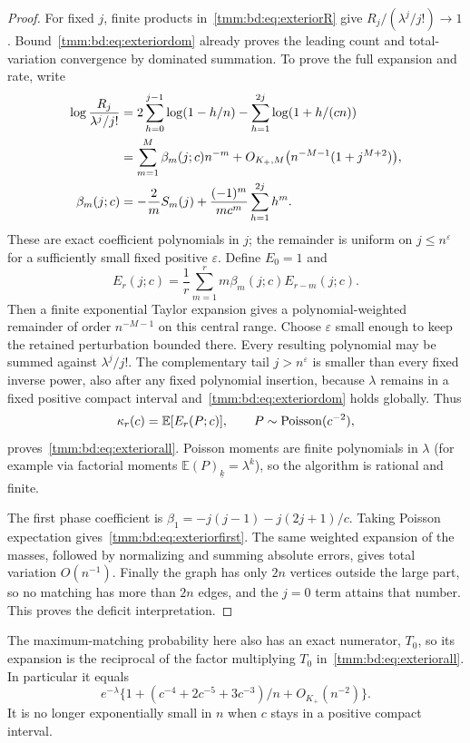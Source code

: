 \documentclass[11pt,letterpaper]{article}
\theoremstyle{remark}\newtheorem{remark}[theorem]{Remark}
\newcommand{\E}{\mathbb E}\newcommand{\Pp}{\mathbb P}
\newcommand{\fall}[2]{(#1)_{\underline{#2}}}
\begin{document}
\begin{proof}
For fixed $j$, finite products in~\eqref{tmm:bd:eq:exteriorR} give $R_j/(\lambda^j/j!)\to1$. Bound~\eqref{tmm:bd:eq:exteriordom} already proves the leading count and total-variation convergence by dominated summation. To prove the full expansion and rate, write
\begin{align}
 \log\frac{R_j}{\lambda^j/j!}
 &=2\sum_{h=0}^{j-1}\log(1-h/n)-\sum_{h=1}^{2j}\log(1+h/(cn))\notag\\
 &=\sum_{m=1}^M\beta_m(j;c)n^{-m}
       +O_{K_+,M}\bigl(n^{-M-1}(1+j^{M+2})\bigr),\label{tmm:bd:eq:betaseries}\\
 \beta_m(j;c)&=-\frac2mS_m(j)
           +\frac{(-1)^m}{mc^m}\sum_{h=1}^{2j}h^m.\label{tmm:bd:eq:beta}
\end{align}
These are exact coefficient polynomials in $j$; the remainder is uniform on $j\le n^\varepsilon$ for a sufficiently small fixed positive $\varepsilon$. Define $E_0=1$ and
\[
 E_r(j;c)=\frac1r\sum_{m=1}^rm\beta_m(j;c)E_{r-m}(j;c).
\]
Then a finite exponential Taylor expansion gives a polynomial-weighted remainder of order $n^{-M-1}$ on this central range. Choose $\varepsilon$ small enough to keep the retained perturbation bounded there. Every resulting polynomial may be summed against $\lambda^j/j!$. The complementary tail $j>n^\varepsilon$ is smaller than every fixed inverse power, also after any fixed polynomial insertion, because $\lambda$ remains in a fixed positive compact interval and~\eqref{tmm:bd:eq:exteriordom} holds globally. Thus
\begin{equation}\label{tmm:bd:eq:kappaalg}
 \kappa_r(c)=\E[E_r(P;c)],\qquad P\sim\Poi(c^{-2}),
\end{equation}
proves~\eqref{tmm:bd:eq:exteriorall}. Poisson moments are finite polynomials in $\lambda$ (for example via factorial moments $\E\fall Pk=\lambda^k$), so the algorithm is rational and finite.

The first phase coefficient is $\beta_1=-j(j-1)-j(2j+1)/c$. Taking Poisson expectation gives~\eqref{tmm:bd:eq:exteriorfirst}. The same weighted expansion of the masses, followed by normalizing and summing absolute errors, gives total variation $O(n^{-1})$. Finally the graph has only $2n$ vertices outside the large part, so no matching has more than $2n$ edges, and the $j=0$ term attains that number. This proves the deficit interpretation.
\end{proof}
The maximum-matching probability here also has an exact numerator, $T_0$, so its expansion is the reciprocal of the factor multiplying $T_0$ in~\eqref{tmm:bd:eq:exteriorall}. In particular it equals
\[
 e^{-\lambda}\{1+(c^{-4}+2c^{-5}+3c^{-3})/n+O_{K_+}(n^{-2})\}.
\]
It is no longer exponentially small in $n$ when $c$ stays in a positive compact interval.
\end{document}
